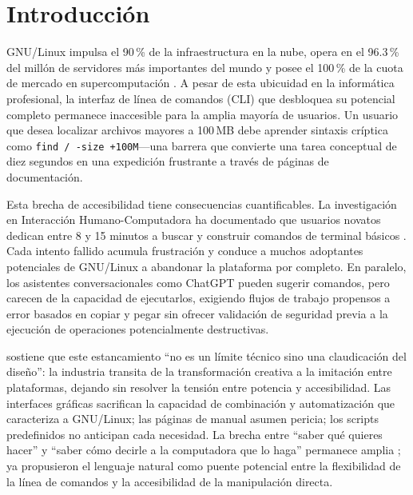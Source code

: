 \documentclass[10pt,a4paper]{article}
\begin{document}
\vspace{12pt}

\section{Introducci\'{o}n}
\label{sec:introduction}

GNU/Linux impulsa el 90\,\% de la infraestructura en la nube, opera en el 96.3\,\% del mill\'{o}n de servidores m\'{a}s importantes del mundo y posee el 100\,\% de la cuota de mercado en supercomputaci\'{o}n \citep{W3Techs2023, Top5002023}. A pesar de esta ubicuidad en la inform\'{a}tica profesional, la interfaz de l\'{i}nea de comandos (CLI) que desbloquea su potencial completo permanece inaccesible para la amplia mayor\'{i}a de usuarios. Un usuario que desea localizar archivos mayores a 100\,MB debe aprender sintaxis cr\'{i}ptica como \texttt{find / -size +100M}---una barrera que convierte una tarea conceptual de diez segundos en una expedici\'{o}n frustrante a trav\'{e}s de p\'{a}ginas de documentaci\'{o}n.

Esta brecha de accesibilidad tiene consecuencias cuantificables. La investigaci\'{o}n en Interacci\'{o}n Humano-Computadora ha documentado que usuarios novatos dedican entre 8 y 15 minutos a buscar y construir comandos de terminal b\'{a}sicos \citep{Norman1988, Norman2013}. Cada intento fallido acumula frustraci\'{o}n y conduce a muchos adoptantes potenciales de GNU/Linux a abandonar la plataforma por completo. En paralelo, los asistentes conversacionales como ChatGPT pueden sugerir comandos, pero carecen de la capacidad de ejecutarlos, exigiendo flujos de trabajo propensos a error basados en copiar y pegar sin ofrecer validaci\'{o}n de seguridad previa a la ejecuci\'{o}n de operaciones potencialmente destructivas.

\citet{Jenson2024} sostiene que este estancamiento ``no es un l\'{i}mite t\'{e}cnico sino una claudicaci\'{o}n del dise\~{n}o'': la industria transita de la transformaci\'{o}n creativa a la imitaci\'{o}n entre plataformas, dejando sin resolver la tensi\'{o}n entre potencia y accesibilidad. Las interfaces gr\'{a}ficas sacrifican la capacidad de combinaci\'{o}n y automatizaci\'{o}n que caracteriza a GNU/Linux; las p\'{a}ginas de manual asumen pericia; los scripts predefinidos no anticipan cada necesidad. La brecha entre ``saber qu\'{e} quieres hacer'' y ``saber c\'{o}mo decirle a la computadora que lo haga'' permanece amplia \citep{Myers2004}; ya \citet{ShneidermanPlaisant2010} propusieron el lenguaje natural como puente potencial entre la flexibilidad de la l\'{i}nea de comandos y la accesibilidad de la manipulaci\'{o}n directa.
\end{document}
